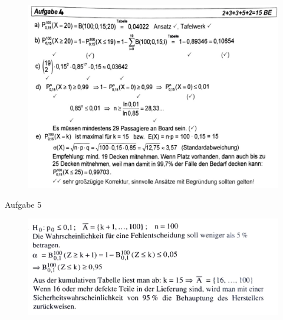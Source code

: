 \documentclass[a4paper,12pt]{article}
\begin{document}
  \begin{figure}[H]
    \vspace{0cm}
    \centering
    \includegraphics[width=1\linewidth]{ml_240215_1a.jpg}
  \end{figure}

  Aufgabe 5
  \begin{figure}[H]
    \vspace{0cm}
    \centering
    \includegraphics[width=1\linewidth]{ml_240215_new2.jpg}
  \end{figure}
\end{document}
